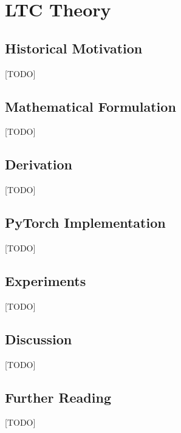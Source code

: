 
\chapter{LTC Theory}
\label{ch:09_ltc_theory}


\section{Historical Motivation}
[TODO]

\section{Mathematical Formulation}
[TODO]

\section{Derivation}
[TODO]

\section{PyTorch Implementation}
[TODO]

\section{Experiments}
[TODO]

\section{Discussion}
[TODO]

\section{Further Reading}
[TODO]
